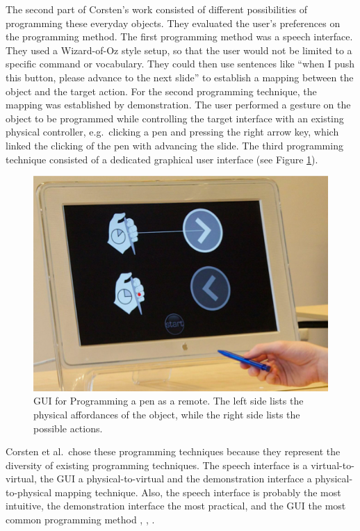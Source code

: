 The second part of Corsten's work consisted of different possibilities of programming these everyday objects.
They evaluated the user's preferences on the programming method.
The first programming method was a speech interface.
They used a Wizard-of-Oz style setup, so that the user would not be limited to a specific command or vocabulary.
They could then use sentences like ``when I push this button, please advance to the next slide'' to establish a mapping between the object and the target action.
For the second programming technique, the mapping was established by demonstration.
The user performed a gesture on the object to be programmed while controlling the target interface with an existing physical controller, e.g.\ clicking a pen and pressing the right arrow key, which linked the clicking of the pen with advancing the slide.
The third programming technique consisted of a dedicated graphical user interface (see Figure \ref{fig:iuigui}).
\begin{figure}[!t]
	\centering
	\includegraphics[width=0.9\columnwidth]{Images/IUIGui}
	\caption{GUI for Programming a pen as a remote. The left side lists the physical affordances of the object, while the right side lists the possible actions.}
	\label{fig:iuigui}
\end{figure}

Corsten et al.\ chose these programming techniques because they represent the diversity of existing programming techniques.
The speech interface is a virtual-to-virtual, the GUI a physical-to-virtual and the demonstration interface a physical-to-physical mapping technique.
Also, the speech interface is probably the most intuitive, the demonstration interface the most practical, and the GUI the most common programming method \cite{heun2013reality}, \cite{cheng10}, \cite{mayer13}.

